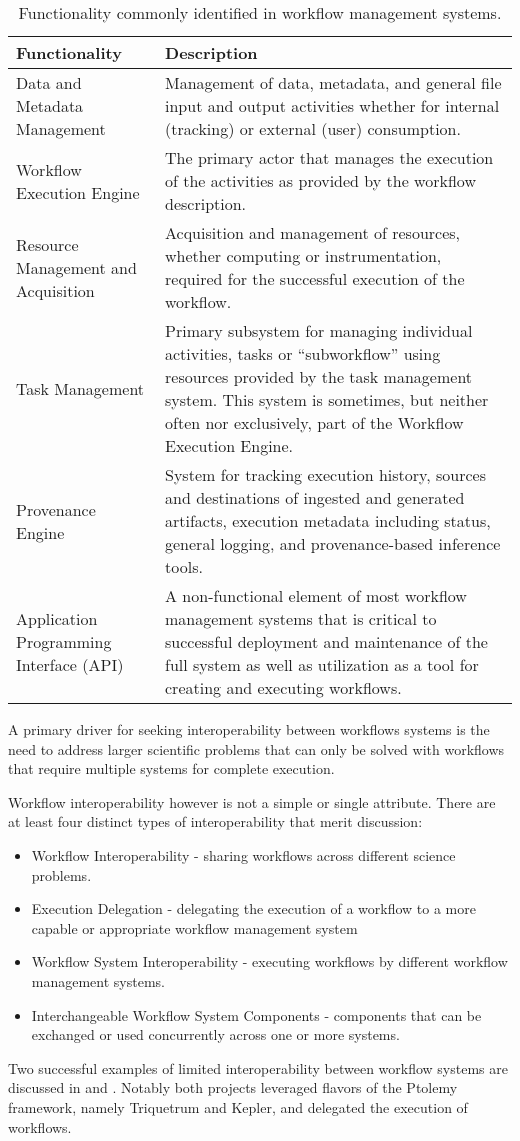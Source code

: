 \begin{table*}[h] \begin{tabularx}{\textwidth}{|X|X|} \hline
\textbf{Functionality} & \textbf{Description} \tabularnewline\hline Data and
Metadata Management & Management of data, metadata, and general file input and
output activities whether for internal (tracking) or external (user)
consumption.  \tabularnewline\hline Workflow Execution Engine & The primary
actor that manages the execution of the activities as provided by the workflow
description. \tabularnewline\hline Resource Management and Acquisition &
Acquisition and management of resources, whether computing or instrumentation,
required for the successful execution of the workflow. \tabularnewline\hline
Task Management & Primary subsystem for managing individual activities, tasks or
``subworkflow'' using resources provided by the task management system. This
system is sometimes, but neither often nor exclusively, part of the Workflow
Execution Engine. \tabularnewline\hline Provenance Engine & System for tracking
execution history, sources and destinations of ingested and generated artifacts,
execution metadata including status, general logging, and provenance-based
inference tools. \tabularnewline\hline Application Programming Interface (API) &
A non-functional element of most workflow management systems that is critical to
successful deployment and maintenance of the full system as well as utilization
as a tool for creating and executing workflows. \tabularnewline\hline
\end{tabularx} \caption{Functionality commonly identified in workflow management
systems.} \label{blocks} \end{table*}


A primary driver for seeking interoperability between workflows systems is the
need to address larger scientific problems that can only be solved with
workflows that require multiple systems for complete execution. 

Workflow interoperability however is not a simple or single attribute. There
are at least four distinct types of interoperability that merit discussion:
\begin{itemize} \item Workflow Interoperability - sharing workflows across
different science problems.  \item Execution Delegation - delegating the
execution of a workflow to a more capable or appropriate workflow management
system \item Workflow System Interoperability - executing workflows by
different workflow management systems.  \item Interchangeable Workflow System
Components - components that can be exchanged or used concurrently across one
or more systems.  \end{itemize} Two successful examples of limited
interoperability between workflow systems are discussed in
\cite{brooks_triquetrum:_2015} and \cite{mandal_integrating_2007}. Notably
both projects leveraged flavors of the Ptolemy framework, namely Triquetrum
and Kepler, and delegated the execution of workflows.





